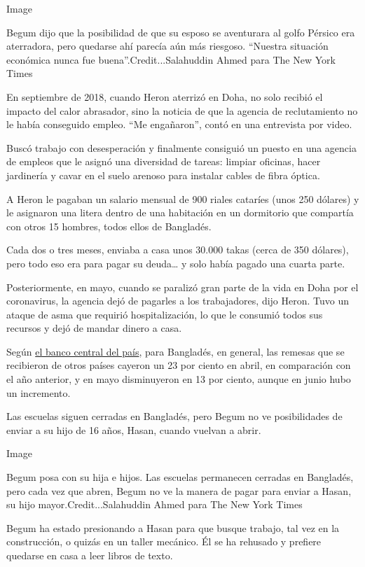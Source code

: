 Image

Begum dijo que la posibilidad de que su esposo se aventurara al golfo
Pérsico era aterradora, pero quedarse ahí parecía aún más riesgoso.
``Nuestra situación económica nunca fue buena''.Credit...Salahuddin
Ahmed para The New York Times

En septiembre de 2018, cuando Heron aterrizó en Doha, no solo recibió el
impacto del calor abrasador, sino la noticia de que la agencia de
reclutamiento no le había conseguido empleo. ``Me engañaron'', contó en
una entrevista por video.

Buscó trabajo con desesperación y finalmente consiguió un puesto en una
agencia de empleos que le asignó una diversidad de tareas: limpiar
oficinas, hacer jardinería y cavar en el suelo arenoso para instalar
cables de fibra óptica.

A Heron le pagaban un salario mensual de 900 riales cataríes (unos 250
dólares) y le asignaron una litera dentro de una habitación en un
dormitorio que compartía con otros 15 hombres, todos ellos de Bangladés.

Cada dos o tres meses, enviaba a casa unos 30.000 takas (cerca de 350
dólares), pero todo eso era para pagar su deuda\ldots{} y solo había
pagado una cuarta parte.

Posteriormente, en mayo, cuando se paralizó gran parte de la vida en
Doha por el coronavirus, la agencia dejó de pagarles a los trabajadores,
dijo Heron. Tuvo un ataque de asma que requirió hospitalización, lo que
le consumió todos sus recursos y dejó de mandar dinero a casa.

Según \href{https://www.bb.org.bd/econdata/wageremitance.php}{el banco
central del país}, para Bangladés, en general, las remesas que se
recibieron de otros países cayeron un 23 por ciento en abril, en
comparación con el año anterior, y en mayo disminuyeron en 13 por
ciento, aunque en junio hubo un incremento.

Las escuelas siguen cerradas en Bangladés, pero Begum no ve
posibilidades de enviar a su hijo de 16 años, Hasan, cuando vuelvan a
abrir.

Image

Begum posa con su hija e hijos. Las escuelas permanecen cerradas en
Bangladés, pero cada vez que abren, Begum no ve la manera de pagar para
enviar a Hasan, su hijo mayor.Credit...Salahuddin Ahmed para The New
York Times

Begum ha estado presionando a Hasan para que busque trabajo, tal vez en
la construcción, o quizás en un taller mecánico. Él se ha rehusado y
prefiere quedarse en casa a leer libros de texto.


